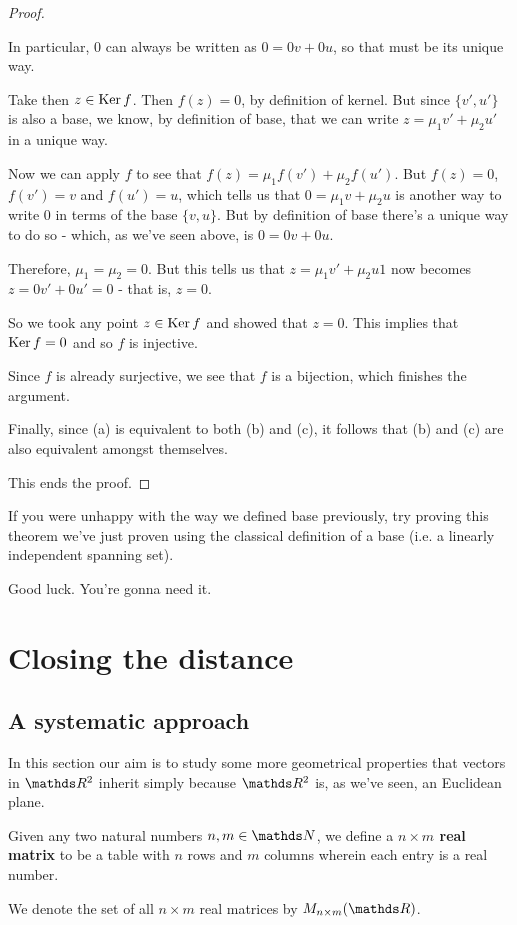 \begin{proof}
\begin{itemize}
		In particular, $0$ can always be written as $0=0v+0u$, so that must be its unique way.
		
		Take then $z\in \operatorname{Ker} f$. Then $f(z)=0$, by definition of kernel. But since $\{v',u'\}$ is also a base, we know, by definition of base, that we can write $z=\mu_1v'+\mu_2u'$ in a unique way.
		
		Now we can apply $f$ to see that $f(z)=\mu_1f(v')+\mu_2f(u')$. But $f(z)=0$, $f(v')=v$ and $f(u')=u$, which tells us that $0=\mu_1v+\mu_2u$ is another way to write $0$ in terms of the base $\{v,u\}$. But by definition of base there's a unique way to do so - which, as we've seen above, is $0=0v+0u$.
		
		Therefore, $\mu_1=\mu_2=0$. But this tells us that $z=\mu_1v'+\mu_2u1$ now becomes $z=0v'+0u'=0$ - that is, $z=0$.
		
		So we took any point $z\in \operatorname{Ker} f$ and showed that $z=0$. This implies that $\operatorname{Ker} f=0$ and so $f$ is injective.
		
		Since $f$ is already surjective, we see that $f$ is a bijection, which finishes the argument.
	\end{itemize}

Finally, since (a) is equivalent to both (b) and (c), it follows that (b) and (c) are also equivalent amongst themselves.

This ends the proof.
\end{proof}
\begin{rmk}
	If you were unhappy with the way we defined base previously, try proving this theorem we've just proven using the classical definition of a base (i.e. a linearly independent spanning set).
	
	Good luck. You're gonna need it.
\end{rmk}

\newpage
\section{Closing the distance}
\subsection{A systematic approach}

In this section our aim is to study some more geometrical properties that vectors in $\R^2$ inherit simply because $\R^2$ is, as we've seen, an Euclidean plane.

\begin{df}
	Given any two natural numbers $n,m\in\N$, we define a \textbf{$n\times m$ real matrix} to be a table with $n$ rows and $m$ columns wherein each entry is a real number.
	
	We denote the set of all $n\times m$ real matrices by $M_{n\times m}(\R)$.
\end{df}

